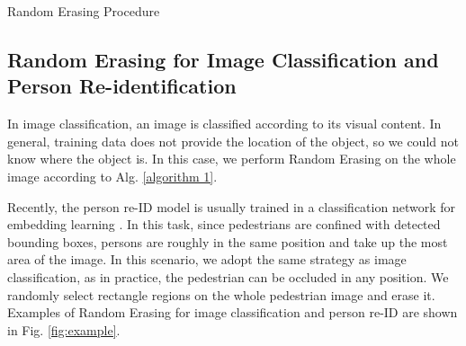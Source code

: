 \documentclass[10pt,twocolumn,letterpaper]{article}
\begin{document}
\begin{algorithm}[t]
\SetAlgoLined
{}
\caption{Random Erasing Procedure}\label{algorithm 1}

\end{algorithm}




\subsection{Random Erasing for Image Classification and Person Re-identification}

In image classification, an image is classified according to its visual content. In general, training data does not provide the location of the object, so we could not know where the object is. In this case,   we perform Random Erasing on the whole image according to Alg. \ref{algorithm 1}.

Recently, the person re-ID model is usually trained in a classification network for embedding learning \cite{reid-survey}. In this task, since pedestrians are confined with detected bounding boxes, persons are roughly in the same position and take up the most area of the image. In this scenario, we adopt the same strategy as image classification, as in practice, the pedestrian can be occluded in any position. We randomly select rectangle regions on the whole pedestrian image and erase it. Examples of Random Erasing for image classification and person re-ID are shown in Fig. \ref{fig:example}.
\end{document}
